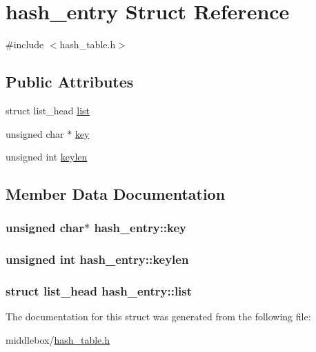 \hypertarget{structhash__entry}{\section{hash\-\_\-entry Struct Reference}
\label{structhash__entry}
}


{\ttfamily \#include $<$hash\-\_\-table.\-h$>$}

\subsection*{Public Attributes}
\begin{DoxyCompactItemize}
\item 
struct list\-\_\-head \hyperlink{structhash__entry_ada52d1b11e544cd19b58007cc3713069}{list}
\item 
unsigned char $\ast$ \hyperlink{structhash__entry_a3c21183a4d6fc5a89fa790359792ca93}{key}
\item 
unsigned int \hyperlink{structhash__entry_a6f87c5657a590b7a848cc3f9a1d30d13}{keylen}
\end{DoxyCompactItemize}


\subsection{Member Data Documentation}
\hypertarget{structhash__entry_a3c21183a4d6fc5a89fa790359792ca93}{
\subsubsection[{key}]{\setlength{\rightskip}{0pt plus 5cm}unsigned char$\ast$ hash\-\_\-entry\-::key}}\label{structhash__entry_a3c21183a4d6fc5a89fa790359792ca93}
\hypertarget{structhash__entry_a6f87c5657a590b7a848cc3f9a1d30d13}{
\subsubsection[{keylen}]{\setlength{\rightskip}{0pt plus 5cm}unsigned int hash\-\_\-entry\-::keylen}}\label{structhash__entry_a6f87c5657a590b7a848cc3f9a1d30d13}
\hypertarget{structhash__entry_ada52d1b11e544cd19b58007cc3713069}{
\subsubsection[{list}]{\setlength{\rightskip}{0pt plus 5cm}struct list\-\_\-head hash\-\_\-entry\-::list}}\label{structhash__entry_ada52d1b11e544cd19b58007cc3713069}


The documentation for this struct was generated from the following file\-:\begin{DoxyCompactItemize}
\item 
middlebox/\hyperlink{hash__table_8h}{hash\-\_\-table.\-h}\end{DoxyCompactItemize}
